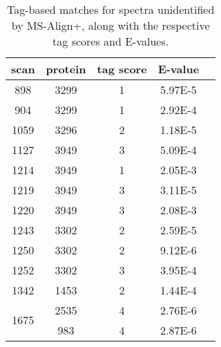 \documentclass{article}[12pt]
\begin{document}
\begin{landscape}

\begin{table}[t]\footnotesize
\vspace{3mm}\
{\centering
\begin{center}
\begin{tabular}{|c|c|c|c|c|}
\hline
scan & protein & tag score & E-value \\
\hline
\hline
898 & 3299 & 1 & 5.97E-5\\
\hline
904 & 3299 & 1 & 2.92E-4\\
\hline
1059 & 3296 & 2 & 1.18E-5\\
\hline
1127 & 3949 & 3 & 5.09E-4\\
\hline
1214 & 3949 & 1 & 2.05E-3\\
\hline
1219 & 3949 & 3 & 3.11E-5\\
\hline
1220 & 3949 & 3 & 2.08E-3\\
\hline
1243 & 3302 & 2 & 2.59E-5\\
\hline
1250 & 3302 & 2 & 9.12E-6\\
\hline
1252 & 3302 & 3 & 3.95E-4\\
\hline
1342 & 1453 & 2 & 1.44E-4\\
\hline
\multirow{2}{*}{1675} & 2535 & 4 & 2.76E-6\\
& 983 & 4 & 2.87E-6\\
\hline
\end{tabular}
\end{center}
\par}
\centering
\caption{Tag-based matches for spectra unidentified by MS-Align+, along with the respective tag scores and E-values.}
\vspace{3mm}
\label{table:unident-spectra}
\end{table}
\end{landscape}


\end{document}
